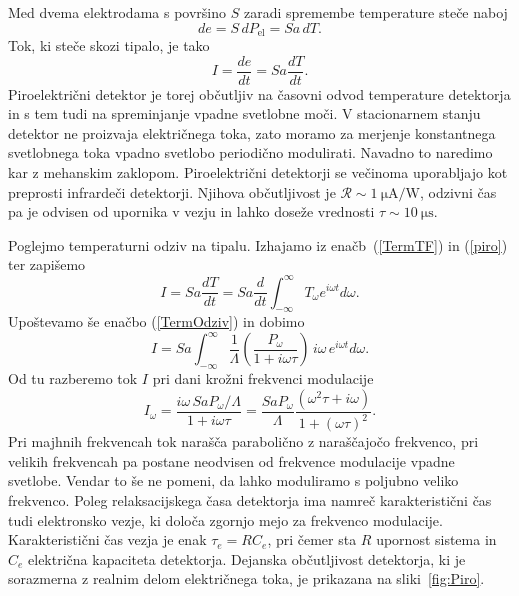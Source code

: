 Med dvema elektrodama s površino $S$ zaradi spremembe temperature steče naboj
\begin{equation}
de = S\, dP_\mathrm{el} = S a\, dT.
\end{equation}
Tok, ki steče skozi tipalo, je tako
\begin{equation}
I = \frac{de}{dt} = S a \frac{dT}{dt}.
\label{piro}
\end{equation}
Piroelektrični detektor je torej občutljiv na časovni odvod temperature detektorja in s tem 
tudi na spreminjanje vpadne svetlobne moči. V stacionarnem stanju 
detektor ne proizvaja električnega toka, zato moramo za merjenje 
konstantnega svetlobnega toka vpadno svetlobo periodično modulirati.
Navadno to naredimo kar z mehanskim zaklopom. Piroelektrični detektorji
se večinoma uporabljajo kot preprosti infrardeči detektorji.
Njihova občutljivost je $\mathcal{R} \sim 1~\si{\micro\ampere/\watt}$, odzivni čas pa je odvisen od 
upornika v vezju in lahko doseže vrednosti $\tau \sim 10~\si{\micro\second}$.

Poglejmo temperaturni odziv na tipalu. Izhajamo iz enačb~(\ref{TermTF}) in (\ref{piro})
ter zapišemo
\begin{equation}
I = Sa \frac{dT}{dt} = Sa \frac{d}{dt} \int_{-\infty}^{\infty} T_\omega e^{i\omega t}d\omega.
\end{equation}
Upoštevamo še enačbo (\ref{TermOdziv}) in dobimo
\begin{equation}
I=Sa\int_{-\infty}^{\infty}\frac{1}{\Lambda}\left(\frac{P_\omega}{1+i \omega \tau}\right) \,i \omega\,
e^{i\omega t}d\omega.
\end{equation}
Od tu razberemo tok $I$ pri dani krožni frekvenci modulacije
\begin{equation}
I_\omega = \frac{i \omega\, SaP_\omega/\Lambda}{1 + i \omega \tau} = 
\frac{SaP_\omega}{\Lambda}\frac{(\omega^2\tau + i \omega)}{1+(\omega\tau)^2}.
\end{equation}
Pri majhnih frekvencah tok narašča parabolično z naraščajočo frekvenco,
pri velikih frekvencah pa postane neodvisen od
frekvence modulacije vpadne svetlobe. Vendar to še ne pomeni, da lahko moduliramo s poljubno 
veliko frekvenco. Poleg relaksacijskega časa detektorja ima namreč karakteristični čas tudi
elektronsko vezje, ki določa zgornjo mejo za frekvenco modulacije. 
Karakteristični čas vezja je enak $\tau_e = RC_e$, pri čemer
sta $R$ upornost sistema in $C_e$ električna kapaciteta detektorja. Dejanska občutljivost detektorja, 
ki je sorazmerna z realnim delom električnega toka, je prikazana na sliki~\ref{fig:Piro}. 

